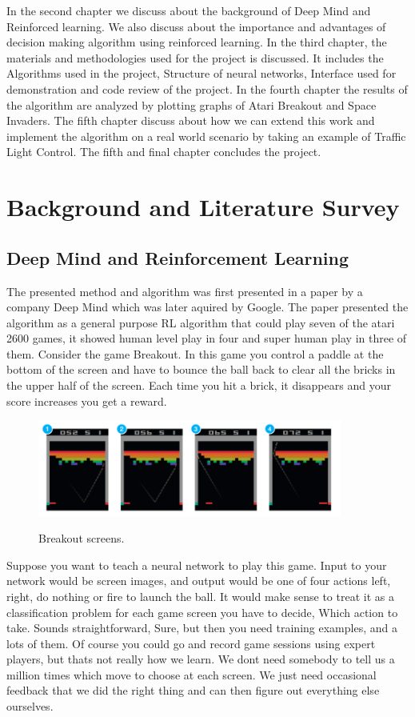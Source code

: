\documentclass[a4paper,11pt]{report}
\begin{document}
			In the second chapter we discuss about the background of Deep Mind and Reinforced learning. We also discuss about the importance and advantages of decision making algorithm using reinforced learning. In the third chapter, the materials and methodologies used for the project is discussed. It includes the Algorithms used in the project, Structure of neural networks, Interface used for demonstration and code review of the project. In the fourth chapter the results of the algorithm are analyzed by plotting graphs of Atari Breakout and Space Invaders. The fifth chapter discuss about how we can extend this work and implement the algorithm on a real world scenario by taking an example of Traffic Light Control. The fifth and final chapter concludes the project.


	\chapter{Background and Literature Survey}
		\section{Deep Mind and Reinforcement Learning}

			The presented method and algorithm was first presented in a paper by a company Deep Mind which was later aquired by Google. The paper presented the algorithm as a general purpose RL algorithm that could play seven of the atari 2600 games, it showed human level play in four and super human play in three of them.
			Consider the game Breakout. In this game you control a paddle at the bottom of the screen and have to bounce the ball back to clear all the bricks in the upper half of the screen. Each time you hit a brick, it disappears and your score increases you get a reward.

			\begin{figure}[!ht]
				\begin{centering}
					\includegraphics[width=10cm]{../Design/images/breakout.png}\\
					\caption{Breakout screens.}
				\end{centering}
			\end{figure}
			Suppose you want to teach a neural network to play this game. Input to your network would be screen images, and output would be one of four actions left, right, do nothing or fire to launch the ball. It would make sense to treat it as a classification problem for each game screen you have to decide, Which action to take. Sounds straightforward, Sure, but then you need training examples, and a lots of them. Of course you could go and record game sessions using expert players, but thats not really how we learn. We dont need somebody to tell us a million times which move to choose at each screen. We just need occasional feedback that we did the right thing and can then figure out everything else ourselves.
\end{document}
